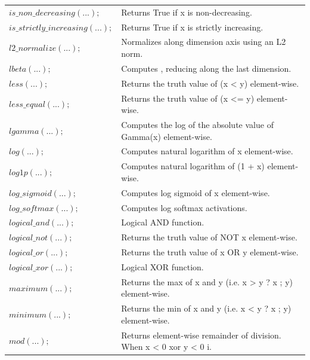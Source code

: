 \documentclass[12pt]{report}
\begin{document}
\begin{longtable}{ p{} | p{}}
$is\_non\_decreasing(...);$ & Returns True if x is non-decreasing. \\ 

$is\_strictly\_increasing(...);$ & Returns True if x is strictly increasing. \\ 

$l2\_normalize(...);$ & Normalizes along dimension axis using an L2 norm. \\ 

$lbeta(...);$ & Computes , reducing along the last dimension. \\ 

$less(...);$ & Returns the truth value of (x < y) element-wise. \\ 

$less\_equal(...);$ & Returns the truth value of (x <= y) element-wise. \\ 

$lgamma(...);$ & Computes the log of the absolute value of Gamma(x) element-wise. \\ 

$log(...);$ & Computes natural logarithm of x element-wise. \\ 

$log1p(...);$ & Computes natural logarithm of (1 + x) element-wise. \\ 

$log\_sigmoid(...);$ & Computes log sigmoid of x element-wise. \\ 

$log\_softmax(...);$ & Computes log softmax activations. \\ 

$logical\_and(...);$ & Logical AND function. \\ 

$logical\_not(...);$ & Returns the truth value of NOT x element-wise. \\ 

$logical\_or(...);$ & Returns the truth value of x OR y element-wise. \\ 

$logical\_xor(...);$ & Logical XOR function. \\ 

$maximum(...);$ & Returns the max of x and y (i.e. x > y ? x ;  y) element-wise. \\ 

$minimum(...);$ & Returns the min of x and y (i.e. x < y ? x ; y) element-wise. \\ 

$mod(...);$ & Returns element-wise remainder of division. When x < 0 xor y < 0 i. \\ 


\end{longtable}
\end{document}
